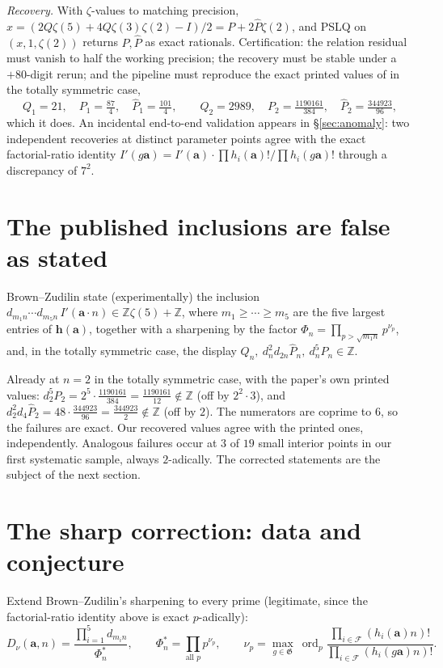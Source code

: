 \documentclass[11pt]{article}
\theoremstyle{definition}
\newcommand{\dn}[1]{d_{#1}}
\newcommand{\Dnu}{D_{\nu}}
\newcommand{\ord}{\operatorname{ord}}
\newcommand{\Z}{\mathbb{Z}}
\newcommand{\frG}{\mathfrak{G}}
\newcommand{\cF}{\mathcal{F}}
\begin{document}
\emph{Recovery.} With $\zeta$-values to matching precision,
$x=(2Q\zeta(5)+4Q\zeta(3)\zeta(2)-I)/2=P+2\hat P\zeta(2)$, and PSLQ on
$(x,1,\zeta(2))$ returns $P,\hat P$ as exact rationals. Certification:
the relation residual must vanish to half the working precision; the
recovery must be stable under a $+80$-digit rerun; and the pipeline must
reproduce the exact printed values of \cite{BZ} in the totally symmetric
case,
\[
Q_1=21,\quad P_1=\tfrac{87}{4},\quad \hat P_1=\tfrac{101}{4},\qquad
Q_2=2989,\quad P_2=\tfrac{1190161}{384},\quad
\hat P_2=\tfrac{344923}{96},
\]
which it does. An incidental end-to-end validation appears in
\S\ref{sec:anomaly}: two independent recoveries at distinct parameter
points agree with the exact factorial-ratio identity
$I'(g\mathbf a)=I'(\mathbf a)\cdot\prod h_i(\mathbf a)!/\prod
h_i(g\mathbf a)!$ through a discrepancy of $7^2$.

\section{The published inclusions are false as stated}
\label{sec:corrections}

Brown--Zudilin state (experimentally) the inclusion
$\dn{m_1n}\cdots \dn{m_5n}\,I'(\mathbf a\cdot n)\in\Z\zeta(5)+\Z$, where
$m_1\ge\cdots\ge m_5$ are the five largest entries of
$\mathbf h(\mathbf a)$, together with a sharpening by the factor
$\Phi_n=\prod_{p>\sqrt{m_1n}}p^{\nu_p}$, and, in the totally symmetric
case, the display $Q_n,\ \dn{n}^2\dn{2n}\hat P_n,\ \dn{n}^5P_n\in\Z$.

Already at $n=2$ in the totally symmetric case, with the paper's own
printed values: $\dn{2}^5P_2=2^5\cdot\frac{1190161}{384}
=\frac{1190161}{12}\notin\Z$ (off by $2^2\cdot3$), and
$\dn{2}^2\dn{4}\hat P_2=48\cdot\frac{344923}{96}
=\frac{344923}{2}\notin\Z$ (off by $2$). The numerators are coprime to
$6$, so the failures are exact. Our recovered values agree with the
printed ones, independently. Analogous failures occur at $3$ of $19$
small interior points in our first systematic sample, always
$2$-adically. The corrected statements are the subject of the next
section.

\section{The sharp correction: data and conjecture}
\label{sec:conjecture}

Extend Brown--Zudilin's sharpening to every prime (legitimate, since the
factorial-ratio identity above is exact $p$-adically):
\[
\Dnu(\mathbf a,n)=\frac{\prod_{i=1}^{5}\dn{m_in}}{\Phi^{*}_n},\qquad
\Phi^{*}_n=\prod_{\text{all }p}p^{\nu_p},\qquad
\nu_p=\max_{g\in\frG}\ \ord_p
\frac{\prod_{i\in\cF}(h_i(\mathbf a)n)!}{\prod_{i\in\cF}(h_i(g\mathbf a)n)!}.
\]
\end{document}
